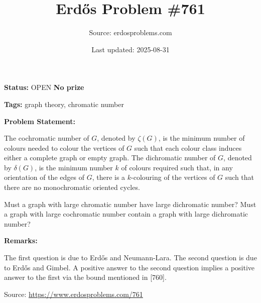 \documentclass{article}
\title{Erd\H{o}s Problem \#761}
\date{Last updated: 2025-08-31}
\author{Source: erdosproblems.com}
\begin{document}
\maketitle

\noindent\textbf{Status:} OPEN \quad \textbf{No prize}

\noindent\textbf{Tags:} graph theory, chromatic number

\medskip
\noindent\textbf{Problem Statement:}

The cochromatic number of $G$, denoted by $\zeta(G)$, is the minimum number of colours needed to colour the vertices of $G$ such that each colour class induces either a complete graph or empty graph. The dichromatic number of $G$, denoted by $\delta(G)$, is the minimum number $k$ of colours required such that, in any orientation of the edges of $G$, there is a $k$-colouring of the vertices of $G$ such that there are no monochromatic oriented cycles. 

Must a graph with large chromatic number have large dichromatic number? Must a graph with large cochromatic number contain a graph with large dichromatic number?

\bigskip
\noindent\textbf{Remarks:}

The first question is due to Erd\H{o}s and Neumann-Lara. The second question is due to Erd\H{o}s and Gimbel. A positive answer to the second question implies a positive answer to the first via the bound mentioned in [760].

\bigskip
\noindent\small{Source: \url{https://www.erdosproblems.com/761}}
\end{document}
